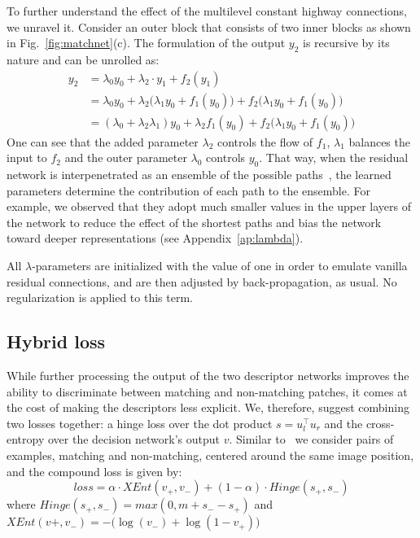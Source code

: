 \documentclass[10pt, twocolumn, letterpaper]{article}
\begin{document}
To further understand the effect of the multilevel constant highway connections, we unravel it. Consider an outer block that consists of two inner blocks as shown in Fig.~\ref{fig:matchnet}(c). The formulation of the output $y_2$ is recursive by its nature and can be unrolled as:
\begin{equation}
\label{eq:unrolled}
\begin{split}
y_2 &= \lambda_0 y_0 + \lambda_2 \cdot y_1 + f_2(y_1) \\
	&= \lambda_0 y_0 + \lambda_2 \big( \lambda_1 y_0 + f_1(y_0) \big) +f_2\big(\lambda_1 y_0 + f_1(y_0)\big) \\
    &= (\lambda_0 + \lambda_2 \lambda_1)y_0 + \lambda_2 f_1(y_0) +f_2\big(\lambda_1 y_0 + f_1(y_0)\big)
\end{split}
\end{equation}
One can see that the added parameter $\lambda_2$ controls the flow of $f_1$, $\lambda_1$ balances the input to $f_2$ and the outer parameter $\lambda_0$ controls $y_0$. That way, when the residual network is interpenetrated as an ensemble of the possible paths~\cite{Veit2016}, the learned parameters determine the contribution of each path to the ensemble. For example, we observed that they adopt much smaller values in the upper layers of the network to reduce the effect of the shortest paths and bias the network toward deeper representations (see Appendix~\ref{ap:lambda}). 

All $\lambda$-parameters are initialized with the value of one in order to emulate vanilla residual connections, and are then adjusted by back-propagation, as usual. No regularization is applied to this term. 


\subsection{Hybrid loss}
\label{sec:hybrid}

While further processing the output of the two descriptor networks improves the ability to discriminate between matching and non-matching patches, it comes at the cost of making the descriptors less explicit. We, therefore, suggest combining two losses together: a hinge loss over the dot product $s=u_l^\top u_r$ and the cross-entropy over the decision network's output $v$. Similar to~\cite{newlecun} we consider pairs of examples, matching and non-matching, centered around the same image position, and the compound loss is given by: 
\begin{equation}
loss = \alpha\cdot \mathit{XEnt}(v_+,v_-) + (1-\alpha)\cdot Hinge(s_+,s_-)
\end{equation}
where $Hinge(s_+,s_-) = max(0,m+s_- -s_+)$ and $\mathit{XEnt}(v+,v_-)= -(\log(v_-) + \log(1-v_+)\big)$
\end{document}
